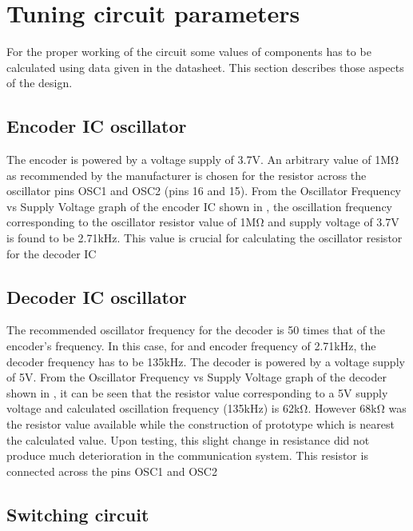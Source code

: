\section{Tuning circuit parameters}
For the proper working of the circuit some values of components has to be calculated using data given in the datasheet. This section describes those aspects of the design.
\subsection{Encoder IC oscillator}


The encoder is powered by a voltage supply of 3.7V. An arbitrary value of 1MΩ as recommended by the manufacturer is chosen for the resistor across the oscillator pins OSC1 and OSC2 (pins 16 and 15). From the Oscillator Frequency vs Supply Voltage graph of the encoder IC shown in , the oscillation frequency corresponding to the oscillator resistor value of 1MΩ and supply voltage of 3.7V is found to be 2.71kHz. This value is crucial for calculating the oscillator resistor for  the decoder IC

\subsection{Decoder IC oscillator}
The recommended oscillator frequency for the decoder is 50 times that of the encoder's frequency. In this case, for and encoder frequency of 2.71kHz, the decoder frequency has to be 135kHz. The decoder is powered by a voltage supply of 5V. From the Oscillator Frequency vs Supply Voltage graph of the decoder shown in , it can be seen that the resistor value corresponding to a 5V supply voltage and calculated oscillation frequency (135kHz) is 62kΩ. However  68kΩ was the resistor value available while the construction of prototype which is nearest the calculated value. Upon testing, this slight change in resistance did not produce much deterioration in the communication system. This resistor is connected across the pins OSC1 and OSC2
\vspace*{10pt}

\vspace*{36pt}

\subsection{Switching circuit}


